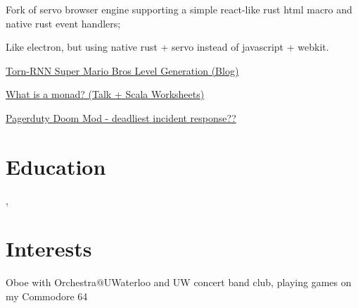 \documentclass[12pt]{jmichaud-resume}
\begin{document}
\hfill
\begin{minipage}[t]{0.49\textwidth}
	
	 \hfill
	\begin{tightemize}
		\item Fork of servo browser engine supporting a simple react-like rust html macro and native rust event handlers; \item Like electron, but using native rust + servo instead of javascript + webkit. 
	\end{tightemize}
	\sectionsep
	
\end{minipage} 
\hfill
\begin{minipage}[t]{0.49\textwidth}
	
	 \hfill
	\begin{tightemize}
		\item\href{https://medium.com/@justin_michaud/super-mario-bros-level-generation-using-torch-rnn-726ddea7e9b7}{Torn-RNN Super Mario Bros Level Generation (Blog)}
		\item\href{https://github.com/justinmichaud/scala-monad-worksheets/}{What is a monad? (Talk + Scala Worksheets)}
		\item\href{NOWHERE}{Pagerduty Doom Mod - deadliest incident response??}
	\end{tightemize}
	\sectionsep
\end{minipage}

\section{Education} 
,  \hfill {}

\section{Interests}
Oboe with Orchestra@UWaterloo and UW concert band club, playing games on my Commodore 64\\
\end{document}
